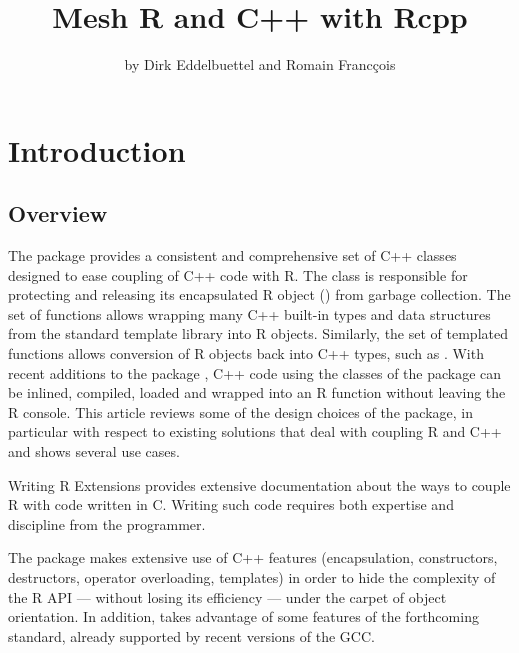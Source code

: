 \title{Mesh R and C++ with Rcpp}
\author{by Dirk Eddelbuettel and Romain Franc\c{c}ois}

\maketitle

\abstract{
}

\section{Introduction}

\subsection{Overview}
The  package provides a consistent and comprehensive set 
of C++ classes designed to ease coupling of C++ code
with R. The  class is responsible for 
protecting and releasing its encapsulated R object ()
from garbage collection. The  set of functions allows
wrapping many C++ built-in types and data structures from the standard
template library into R objects. Similarly, the  set of 
templated functions allows conversion of R objects back into C++
types, such as . With recent additions to the 
 package \citep{cran:inline}, 
C++ code using the classes of the 
 package can be inlined, compiled, loaded and wrapped 
into an R function without leaving the R console. 
This article reviews some of the design choices of the
 package, in particular with respect to existing solutions
that deal with coupling R and C++ and shows several use cases.

Writing R Extensions \citep{R:exts} provides extensive 
documentation about the ways to couple R with code written in C. 
Writing such code requires both expertise and discipline from the 
programmer.


The  package makes extensive use of C++ features (encapsulation, 
constructors, destructors, operator overloading, templates) in order
to hide the complexity of the R API --- without losing its 
efficiency --- under the carpet of object orientation. In addition, 
 takes advantage of some features of the forthcoming  
standard, already supported by recent versions of the GCC.

